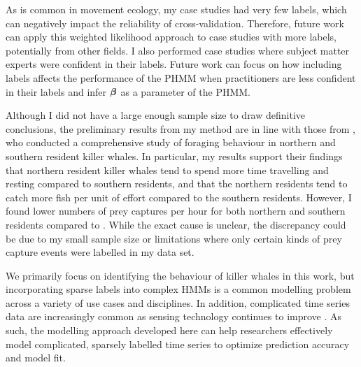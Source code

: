 As is common in movement ecology, my case studies had very few labels, which can negatively impact the reliability of cross-validation. Therefore, future work can apply this weighted likelihood approach to case studies with more labels, potentially from other fields. I also performed case studies where subject matter experts were confident in their labels. Future work can focus on how including labels affects the performance of the PHMM when practitioners are less confident in their labels and infer $\boldsymbol{\beta}$ as a parameter of the PHMM.

Although I did not have a large enough sample size to draw definitive conclusions, the preliminary results from my method are in line with those from \citet{Tennessen:2023}, who conducted a comprehensive study of foraging behaviour in northern and southern resident killer whales. In particular, my results support their findings that northern resident killer whales tend to spend more time travelling and resting compared to southern residents, and that the northern residents tend to catch more fish per unit of effort compared to the southern residents. However, I found lower numbers of prey captures per hour for both northern and southern residents compared to \citet{Tennessen:2023}. While the exact cause is unclear, the discrepancy could be due to my small sample size or limitations where only certain kinds of prey capture events were labelled in my data set.

We primarily focus on identifying the behaviour of killer whales in this work, but incorporating sparse labels into complex HMMs is a common modelling problem across a variety of use cases and disciplines. In addition, complicated time series data are increasingly common as sensing technology continues to improve \citep{Patterson:2017}. As such, the modelling approach developed here can help researchers effectively model complicated, sparsely labelled time series to optimize prediction accuracy and model fit.